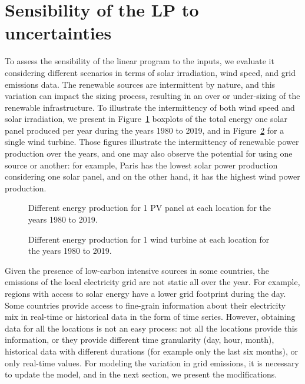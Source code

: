 \section{Sensibility of the LP to  uncertainties}
\label{sec:sensitivity}

To assess the sensibility of the linear program to the inputs, we evaluate it considering different scenarios in terms of solar irradiation, wind speed, and grid emissions data. The renewable sources are intermittent by nature, and this variation can impact the sizing process, resulting in an over or under-sizing of the renewable infrastructure. To illustrate the intermittency of both wind speed and solar irradiation, we present in Figure~\ref{fig:pv_boxplots} boxplots of the total energy one solar panel produced per year during the years 1980 to 2019, and in Figure~\ref{fig:wt_boxplots} for a single wind turbine. Those figures illustrate the intermittency of renewable power production over the years, and one may also observe the potential for using one source or another: for example, Paris has the lowest solar power production considering one solar panel, and on the other hand, it has the highest wind power production. 


\begin{figure}[H]
  \centering
  {}
  \caption{Different energy production for 1 PV panel at each location for the years 1980 to 2019.}
  \label{fig:pv_boxplots}
\end{figure}


\begin{figure}[H]
  \centering
  {}
  \caption{Different energy production for 1 wind turbine at each location for the years 1980 to 2019.}
  \label{fig:wt_boxplots}
\end{figure}



Given the presence of low-carbon intensive sources in some countries, the emissions of the local electricity grid are not static all over the year. For example, regions with access to solar energy have a lower grid footprint during the day. Some countries provide access to fine-grain information about their electricity mix in real-time or historical data in the form of time series. However, obtaining data for all the locations is not an easy process: not all the locations provide this information, or they provide different time granularity (day, hour, month), historical data with different durations (for example only the last six months), or only real-time values. For modeling the variation in grid emissions, it is necessary to update the model, and in the next section, we present the modifications.


